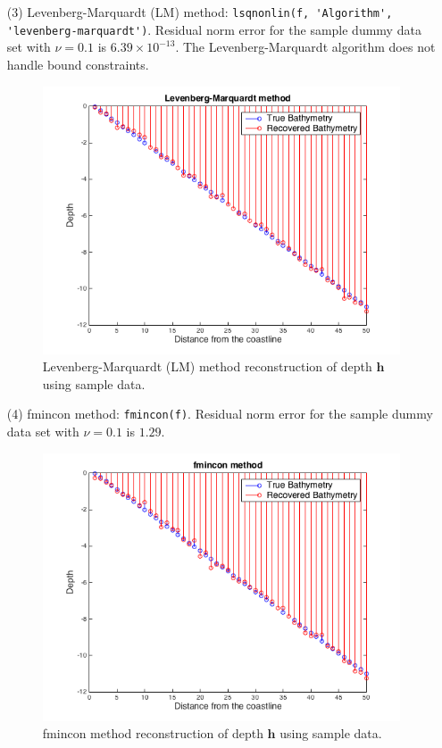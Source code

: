 \begin{itemize}
\item[(3)]  Levenberg-Marquardt (LM) method:  \verb|lsqnonlin(f, 'Algorithm', 'levenberg-marquardt')|. Residual norm error for the sample dummy data set  with $\nu = 0.1$ is $6.39 \times 10^{-13}$. The Levenberg-Marquardt algorithm does not handle bound constraints. 
\begin{figure}[H]
\center
\includegraphics[scale=0.6]{img/LM_linear.png} 
\caption{Levenberg-Marquardt (LM) method reconstruction of depth $\mathbf{h}$ using sample data.}
\label{LM_fig}
\end{figure}
\item[(4)]  fmincon method:  \verb|fmincon(f)|. Residual norm error for the sample dummy data set  with $\nu = 0.1$ is $1.29$. 
\begin{figure}[H]
\center
\includegraphics[scale=0.6]{img/fmincon_linear.png} 
\caption{fmincon method reconstruction of depth $\mathbf{h}$ using sample data.}
\label{LM_fig}
\end{figure}
\end{itemize}
